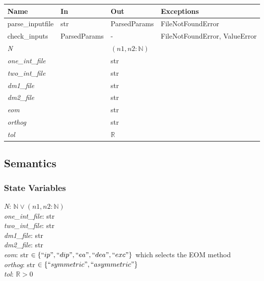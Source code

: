 \documentclass[12pt, titlepage]{article}
\begin{document}
\begin{center}
	\begin{tabular}{p{2.7cm} p{4cm} p{4cm} p{2cm}}
		\hline
		\textbf{Name} & \textbf{In} & \textbf{Out} & \textbf{Exceptions} \\
		\hline
		parse\_inputfile& str& ParsedParams & FileNotFoundError \\
		check\_inputs& ParsedParams& - & FileNotFoundError, ValueError \\
		\textit{N}& & $(n1, n2:\mathbb{N})$ & \\
		\textit{one\_int\_file}& & str & \\
		\textit{two\_int\_file}& & str & \\
		\textit{dm1\_file}& & str & \\
		\textit{dm2\_file}& & str & \\
		\textit{eom}& & str & \\
		\textit{orthog}& & str & \\
		\textit{tol}& & $\mathbb{R}$ & \\
		\hline
	\end{tabular}
\end{center}

\subsection{Semantics}

\subsubsection{State Variables}

\textit{N}: $\mathbb{N} \lor (n1, n2:\mathbb{N})$\\
\textit{one\_int\_file}: str\\
\textit{two\_int\_file}: str\\
\textit{dm1\_file}: str\\
\textit{dm2\_file}: str\\
\textit{eom}: str $\in \{``ip", ``dip", ``ea", ``dea", ``exc"\}$ which selects 
the 
EOM method\\
\textit{orthog}: str $\in \{``symmetric", ``asymmetric"\}$\\
\textit{tol}: $\mathbb{R} > 0$\\
\end{document}
